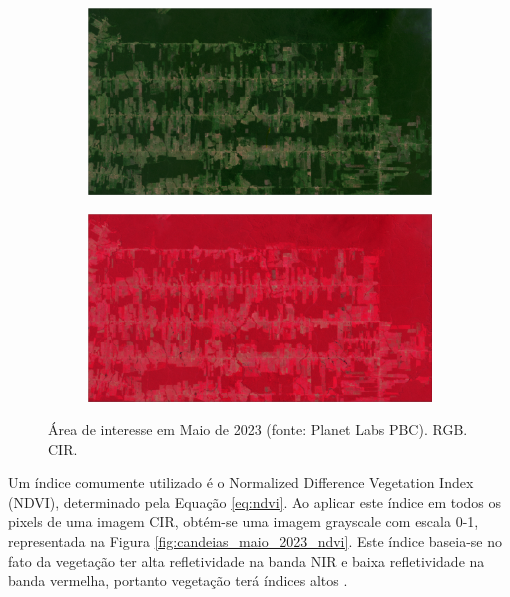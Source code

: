 \documentclass[11pt]{article}
\begin{document}
\begin{figure}[!htb]
	\centering
	\begin{subfigure}[b]{.8\textwidth}
		\centering
		\includegraphics[width=\textwidth]{candeias_maio_2023.png}
		\caption{}
		\label{fig:candeias_maio_2023_rgb}
	\end{subfigure}
	\begin{subfigure}[b]{.8\textwidth}
		\centering
		\includegraphics[width=\textwidth]{candeias_maio_2023_cir.png}
		\caption{}
		\label{fig:candeias_maio_2023_cir}
	\end{subfigure}
	
	\caption{Área de interesse em Maio de 2023 (fonte: Planet Labs PBC).  RGB.  CIR.}
	\label{fig:candeias_maio_2023}
\end{figure}

Um índice comumente utilizado é o Normalized Difference Vegetation Index (NDVI), determinado pela Equação \ref{eq:ndvi}. Ao aplicar este índice em todos os pixels de uma imagem CIR, obtém-se uma imagem grayscale com escala 0-1, representada na Figura \ref{fig:candeias_maio_2023_ndvi}. Este índice baseia-se no fato da vegetação ter alta refletividade na banda NIR e baixa refletividade na banda vermelha, portanto vegetação
terá índices altos \cite{eos:cir:2023}.
\end{document}
